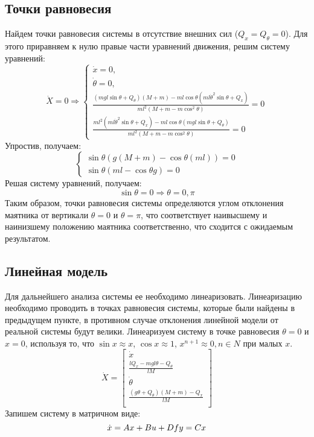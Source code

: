 \subsection{Точки равновесия}
Найдем точки равновесия системы в отсутствие внешних сил ($Q_x = Q_{\theta} = 0$). 
Для этого приравняем к нулю правые части уравнений движения, решим систему уравнений:
\begin{equation}
    \dot{X} = 0 \Rightarrow 
    \begin{cases}
        \dot{x} = 0, \\
        \dot{\theta} = 0, \\
        \frac{(mgl\sin\theta + Q_{\theta})(M + m) - ml\cos\theta(ml\dot{\theta}^2\sin\theta + Q_x)}{ml^2(M + m - m\cos^2\theta)} = 0 \\ 
        \frac{ml^2(ml\dot{\theta}^2\sin\theta + Q_x) - ml\cos\theta(mgl\sin\theta + Q_{\theta})}{ml^2(M + m - m\cos^2\theta)} = 0
    \end{cases}
\end{equation}
Упростив, получаем: 
\begin{equation}
    \begin{cases}
        \sin\theta(g(M + m) - \cos\theta(ml)) = 0 \\ 
        \sin\theta(ml - \cos\theta g) = 0
    \end{cases}
\end{equation}
Решая систему уравнений, получаем:
\begin{equation}
    \sin\theta = 0 \Rightarrow \theta = 0, \pi 
\end{equation}
Таким образом, точки равновесия системы определяются углом отклонения маятника от вертикали $\theta = 0$ и $\theta = \pi$, 
что соответствует наивысшему и наинизшему положению маятника соответственно, что сходится с ожидаемым результатом. 

\subsection{Линейная модель}
Для дальнейшего анализа системы ее необходимо линеаризовать. Линеаризацию необходимо проводить в точках равновесия 
системы, которые были найдены в предыдущем пункте, в противном случае отклонения линейной модели от реальной системы будут велики. 
Линеаризуем систему в точке равновесия $\theta = 0$ и $x = 0$, используя то, что $\sin x \approx x$, $\cos x \approx 1$, $x^{n + 1} \approx 0, n \in N$ 
при малых $x$. 
\begin{equation}
    \dot{X} = \begin{bmatrix}
        \dot{x} \\
        \frac{lQ_x - mgl\theta - Q_{\theta}}{lM} \\
        \dot{\theta} \\
        \frac{(g\theta + Q_{\theta})(M + m) -Q_x}{lM} \\ 
    \end{bmatrix}
\end{equation}
Запишем систему в матричном виде: 
\begin{equation}
    \dot{x} = Ax + Bu + Df \\ 
    y = Cx
\end{equation}
